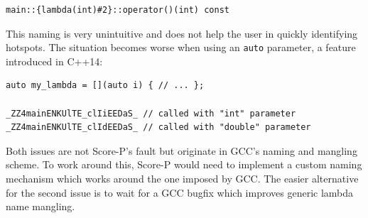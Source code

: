 \begin{verbatim}
main::{lambda(int)#2}::operator()(int) const
\end{verbatim}

\noindent This naming is very unintuitive and does not help the user in quickly identifying hotspots. The situation becomes worse when using an \texttt{auto} parameter, a feature introduced in C++14:

\begin{verbatim}
auto my_lambda = [](auto i) { // ... };

_ZZ4mainENKUlTE_clIiEEDaS_ // called with "int" parameter
_ZZ4mainENKUlTE_clIdEEDaS_ // called with "double" parameter
\end{verbatim}

\noindent Both issues are not Score-P's fault but originate in GCC's naming and mangling scheme. To work around this, Score-P would need to implement a custom naming mechanism which works around the one imposed by GCC. The easier alternative for the second issue is to wait for a GCC bugfix which improves generic lambda name mangling.